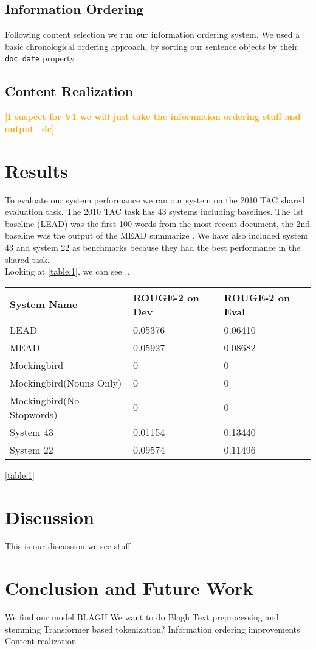 \documentclass[11pt,a4paper]{article}
\newcommand{\spacemanidol}[1]{\textcolor{orange}{\bf \small [#1 --dc]}}
\begin{document}
\subsection{Information Ordering}
Following content selection we run our information ordering system. We used a basic chronological ordering approach, by sorting our sentence objects by their \texttt{doc\_date} property.\\
\subsection{Content Realization}
\spacemanidol{I suspect for V1 we will just take the information ordering stuff and output}
\section{Results}
To evaluate our system performance we ran our system on the 2010 TAC shared evaluation task. The 2010 TAC task has 43 systems including baselines. The 1st baseline (LEAD) was the first 100 words from the most recent document, the 2nd baseline was the output of the MEAD summarize \cite{Radev2003MEADRM}. We have also included system 43 and system 22 as benchmarks because they had the best performance in the shared task. \\
Looking at \ref{table:1}, we can see ..
\begin{table}[h!]
\begin{tabular}{|l|l|l|} \hline
\textbf{System Name} & \textbf{ROUGE-2 on Dev} & \textbf{ROUGE-2 on Eval} \\ \hline
LEAD & 0.05376 & 0.06410 \\ \hline
MEAD & 0.05927 & 0.08682\\ \hline
Mockingbird & 0 & 0 \\ \hline
Mockingbird(Nouns Only) &  0 &  0\\ \hline
Mockingbird(No Stopwords) & 0 & 0 \\ \hline
System 43 & 0.01154 & 0.13440 \\ \hline
System 22 & 0.09574 & 0.11496 \\ \hline
\end{tabular}
\ref{table:1}
\end{table}
\section{Discussion}
This is our discussion we see stuff
\section{Conclusion and Future Work}
We find our model BLAGH
We want to do Blagh
Text preprocessing and stemming
Transformer based tokenization?
Information ordering improvements
Content realization


\end{document}
